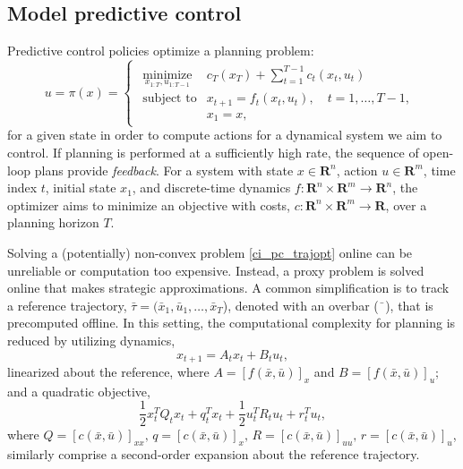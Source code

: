 \subsection{Model predictive control}
Predictive control policies \cite{richalet1978model} optimize a planning problem:
\begin{equation}
	u = \pi(x) = 
	\begin{cases}
	\begin{array}{ll}
		\underset{x_{1:T}, u_{1:T-1}}{\mbox{minimize}} & c_T(x_T) + \sum \limits_{t = 1}^{T-1} c_t(x_t, u_t) \label{ci_pc_trajopt}\\
		\mbox{subject to} & x_{t+1} = f_t(x_t,u_t), \quad t = 1,\dots,T-1,\\
		& x_1 = x,
	\end{array}
	\end{cases}
\end{equation}
for a given state in order to compute actions for a dynamical system we aim to control. If planning is performed at a sufficiently high rate, the sequence of open-loop plans provide \textit{feedback}. For a system with state $x \in \mathbf{R}^{n}$, action $u \in \mathbf{R}^{m}$, time index $t$, initial state $x_1$, and discrete-time dynamics $f : \mathbf{R}^{n} \times \mathbf{R}^{m} \rightarrow \mathbf{R}^{n}$, the optimizer aims to minimize an objective with costs, $c: \mathbf{R}^{n} \times \mathbf{R}^{m} \rightarrow \mathbf{R}$, over a planning horizon $T$.

Solving a (potentially) non-convex problem \eqref{ci_pc_trajopt} online can be unreliable or computation too expensive. Instead, a proxy problem is solved online that makes strategic approximations. A common simplification is to track a reference trajectory, $\bar{\tau} = (\bar{x}_1, \bar{u}_1, \dots, \bar{x}_T$), denoted with an overbar ($\bar{\phantom{a}}$), that is precomputed offline. In this setting, the computational complexity for planning is reduced by utilizing dynamics,
\begin{equation}
	x_{t+1} = A_t x_t + B_t u_t, \label{ci_pc_linear_dynamics}
\end{equation}
linearized about the reference, where $A = [f(\bar{x}, \bar{u})]_x$ and $B = [f(\bar{x}, \bar{u})]_u$; and a quadratic objective, 
\begin{equation}
	\frac{1}{2}x_t^T Q_t x_t + q_t^T x_t + \frac{1}{2}u_t^T R_t u_t  + r_t^T u_t, \label{cipc_quadratic_objective}
\end{equation}
where $Q = [c(\bar{x}, \bar{u})]_{xx}, \, q = [c(\bar{x}, \bar{u})]_x, \, R = [c(\bar{x}, \bar{u})]_{uu}, \, r = [c(\bar{x}, \bar{u})]_u$, similarly comprise a second-order expansion about the reference trajectory.


